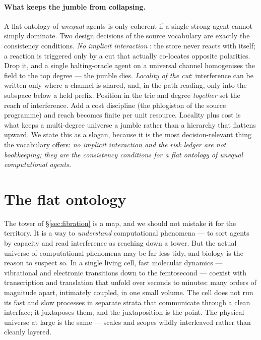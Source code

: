 \paragraph{What keeps the jumble from collapsing.}
A flat ontology of \emph{unequal} agents is only coherent if a single strong agent
cannot simply dominate. Two design decisions of the source vocabulary are exactly
the consistency conditions. \emph{No implicit interaction} \cite{paths}: the store
never reacts with itself; a reaction is triggered only by a cut that actually
co-locates opposite polarities. Drop it, and a single halting-oracle agent on a
universal channel homogenises the field to the top degree --- the jumble dies.
\emph{Locality of the cut}: interference can be written only where a channel is
shared, and, in the path reading, only into the subspace below a held prefix.
Position in the trie and degree \emph{together} set the reach of interference. Add
a cost discipline (the phlogiston of the source programme) and reach becomes finite
per unit resource. Locality plus cost is what keeps a multi-degree universe a
jumble rather than a hierarchy that flattens upward. We state this as a slogan,
because it is the most decision-relevant thing the vocabulary offers: \emph{no
implicit interaction and the risk ledger are not bookkeeping; they are the
consistency conditions for a flat ontology of unequal computational agents.}


\section{The flat ontology}\label{ndo:sec:flat}

The tower of \S\ref{sec:fibration} is a map, and we should not mistake it for the
territory. It is a way to \emph{understand} computational phenomena --- to sort agents
by capacity and read interference as reaching down a tower. But the actual universe of
computational phenomena may be far less tidy, and biology is the reason to suspect so.
In a single living cell, fast molecular dynamics --- vibrational and electronic
transitions down to the femtosecond --- coexist with transcription and translation
that unfold over seconds to minutes: many orders of magnitude apart, intimately
coupled, in one small volume. The cell does not run its fast and slow processes in
separate strata that communicate through a clean interface; it juxtaposes them, and the
juxtaposition is the point. The physical universe at large is the same --- scales and
scopes wildly interleaved rather than cleanly layered.

